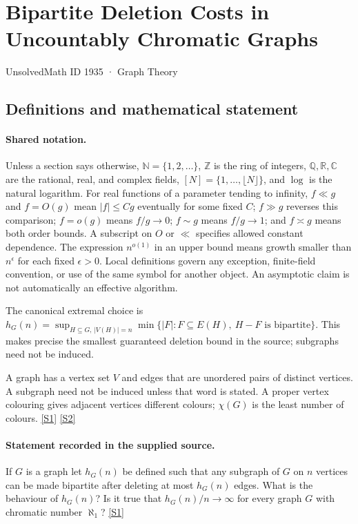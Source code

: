 \documentclass[11pt,a4paper]{article}
\newcommand{\N}{\mathbb{N}}
\newcommand{\Z}{\mathbb{Z}}
\newcommand{\Q}{\mathbb{Q}}
\newcommand{\R}{\mathbb{R}}
\newcommand{\C}{\mathbb{C}}
\newcommand{\sref}[2]{\hyperlink{source:#1:#2}{[S#2]}}
\begin{document}

\setcounter{section}{1934}

\section{Bipartite Deletion Costs in Uncountably Chromatic Graphs}\label{1935}

{\small\sffamily UnsolvedMath ID 1935 · Graph Theory}

\subsection{Definitions and mathematical statement}

\paragraph{Shared notation.}Unless a section says otherwise, $\N=\{1,2,\ldots\}$,
$\Z$ is the ring of integers, $\Q,\R,\C$ are the rational, real, and complex
fields, $[N]=\{1,\ldots,\lfloor N\rfloor\}$, and $\log$ is the natural
logarithm. For real functions of a parameter tending to infinity,
$f\ll g$ and $f=O(g)$ mean $|f|\leq Cg$ eventually for some fixed $C$;
$f\gg g$ reverses this comparison; $f=o(g)$ means $f/g\to0$;
$f\sim g$ means $f/g\to1$; and $f\asymp g$ means both order bounds.
A subscript on $O$ or $\ll$ specifies allowed constant dependence.
The expression $n^{o(1)}$ in an upper bound means growth smaller than
$n^\epsilon$ for each fixed $\epsilon>0$. Local definitions govern any
exception, finite-field convention, or use of the same symbol for another
object. An asymptotic claim is not automatically an effective algorithm.



The canonical extremal choice is $h_G(n)=\sup_{H\subseteq G,\,|V(H)|=n}\min\{|F|:F\subseteq E(H),\ H-F\text{ is bipartite}\}$. This makes precise the smallest guaranteed deletion bound in the source; subgraphs need not be induced.

A graph has a vertex set $V$ and edges that are unordered pairs of distinct vertices. A subgraph need not be induced unless that word is stated. A proper vertex colouring gives adjacent vertices different colours; $\chi(G)$ is the least number of colours. \sref{1935}{1} \sref{1935}{2}

\paragraph{Statement recorded in the supplied source.}
If $G$ is a graph let $h_G(n)$ be defined such that any subgraph of $G$ on $n$ vertices can be made bipartite after deleting at most $h_G(n)$ edges.
What is the behaviour of $h_G(n)$? Is it true that $h_G(n)/n\to \infty$ for every graph $G$ with chromatic number $\aleph_1$? \sref{1935}{1}
\end{document}
